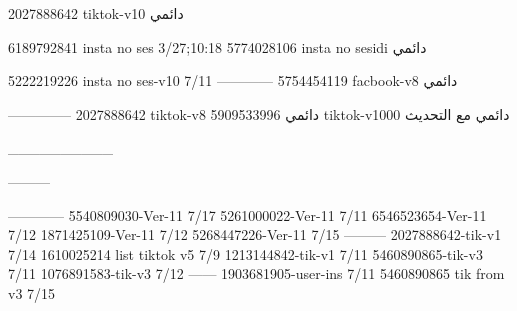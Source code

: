 2027888642 tiktok-v10
دائمي

6189792841 insta no ses
3/27;10:18
5774028106 insta no sesidi
دائمي

5222219226 insta no ses-v10
7/11
------------
5754454119 facbook-v8
دائمي


--------------
2027888642 tiktok-v8
دائمي
5909533996 tiktok-v1000
دائمي مع التحديث

__________

---------

------------
5540809030-Ver-11
7/17
5261000022-Ver-11
7/11
6546523654-Ver-11
7/12
1871425109-Ver-11
7/12
5268447226-Ver-11
7/15
---------
2027888642-tik-v1
7/14
1610025214 list tiktok v5
7/9
1213144842-tik-v1
7/11
5460890865-tik-v3
7/11
1076891583-tik-v3
7/12
------
1903681905-user-ins
7/11
5460890865 tik from v3
7/15

